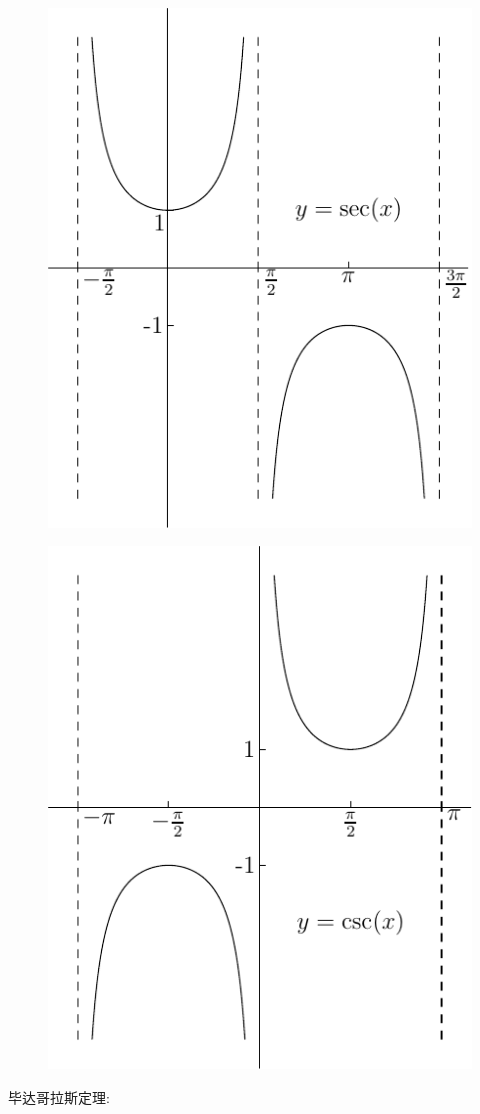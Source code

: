 \documentclass[UTTF8, fontset=ubuntu]{ctexart}
\begin{document}
\begin{figure}
\centering
\includegraphics{sec.pdf}
\end{figure}
\begin{figure}
\centering
\includegraphics{csc.pdf}
\end{figure}

毕达哥拉斯定理:\\
\begin{center}
\end{center}
\end{document}
